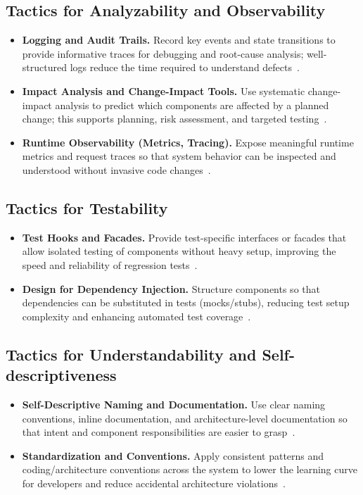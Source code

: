 \subsection{Tactics for Analyzability and Observability}
\begin{itemize}
    \item \textbf{Logging and Audit Trails.} Record key events and state transitions to provide informative traces for debugging and root-cause analysis; well-structured logs reduce the time required to understand defects~\cite{bi2021mining}.
    \item \textbf{Impact Analysis and Change-Impact Tools.} Use systematic change-impact analysis to predict which components are affected by a planned change; this supports planning, risk assessment, and targeted testing~\cite{molnar2020study}.
    \item \textbf{Runtime Observability (Metrics, Tracing).} Expose meaningful runtime metrics and request traces so that system behavior can be inspected and understood without invasive code changes~\cite{lenarduzzi2023critical}.
\end{itemize}

\subsection{Tactics for Testability}
\begin{itemize}
    \item \textbf{Test Hooks and Facades.} Provide test-specific interfaces or facades that allow isolated testing of components without heavy setup, improving the speed and reliability of regression tests~\cite{rahmati2021ensuring}.
    \item \textbf{Design for Dependency Injection.} Structure components so that dependencies can be substituted in tests (mocks/stubs), reducing test setup complexity and enhancing automated test coverage~\cite{kim2009qualitydriven}.
\end{itemize}

\subsection{Tactics for Understandability and Self-descriptiveness}
\begin{itemize}
    \item \textbf{Self-Descriptive Naming and Documentation.} Use clear naming conventions, inline documentation, and architecture-level documentation so that intent and component responsibilities are easier to grasp~\cite{rahmati2021ensuring}.
    \item \textbf{Standardization and Conventions.} Apply consistent patterns and coding/architecture conventions across the system to lower the learning curve for developers and reduce accidental architecture violations~\cite{kassab2018software}.
\end{itemize}

